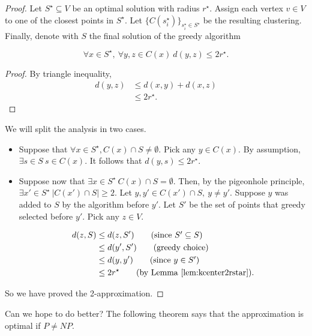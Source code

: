 \begin{proof}
Let $S^\star \subseteq V$ be an optimal solution with radius $r^\star$. Assign each vertex $v \in V$ to one of the closest points in $S^\star$. Let $\{C(s_i^\star)\}_{s_i^\star \in S^\star}$ be the resulting clustering. Finally, denote with $S$ the final solution of the greedy algorithm

\begin{lem}\label{lem:kcenter2rstar}
	\begin{equation}
	\forall x \in S^\star,\ \forall y, z \in C(x)\ d(y, z) \leq 2r^\star.
	\end{equation}
\end{lem}

\begin{proof}
	By triangle inequality,
	\begin{align}
		d(y, z) &\leq d(x, y) + d(x, z)\\
		&\leq 2r^\star.
	\end{align}
\end{proof}

We will split the analysis in two cases.

\begin{itemize}
	\item Suppose that $\forall x \in S^\star, C(x) \cap S \neq \emptyset$. Pick any $y \in C(x)$. By assumption, $\exists s \in S\  s \in C(x)$. It follows that  $d(y, s) \leq 2r^\star$.
	\item Suppose now that $\exists x \in S^\star\ C(x) \cap S = \emptyset$. Then, by the pigeonhole principle, $\exists x' \in S^\star\ |C(x') \cap S| \geq 2$. Let $y, y' \in C(x') \cap S,\ y \neq y'$. Suppose $y$ was added to $S$ by the algorithm before $y'$. Let $S'$ be the set of points that greedy selected before $y'$. Pick  any $z \in V$.
	
	\begin{align}
		d(z, S) &\leq d(z, S') \tag{since $S' \subseteq S$}\\
		&\leq d(y', S') \tag{greedy choice}\\
		&\leq d(y, y') \tag{since $y \in S'$}\\
		&\leq 2r^\star \tag{by Lemma \ref{lem:kcenter2rstar}}.
	\end{align}
\end{itemize}

So we have proved the 2-approximation.
\end{proof}
 Can we hope to do better? The following theorem says that the approximation is optimal if $P\neq NP$.
